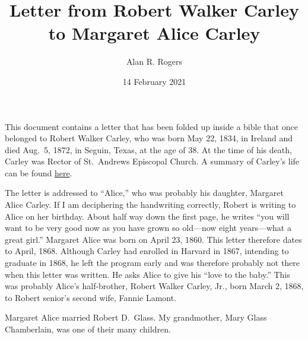 \documentclass[12pt]{article}
\begin{document}
\title{Letter from Robert Walker Carley to Margaret Alice Carley}
\author{Alan R. Rogers}
\date{14 February 2021}
\maketitle

This document contains a letter that has been folded up inside a bible
that once belonged to Robert Walker Carley, who was born May 22, 1834,
in Ireland and died Aug.\ 5, 1872, in Seguin, Texas, at the age of
38. At the time of his death, Carley was Rector of St.\ Andrews
Episcopal Church. A summary of Carley's life can be found
\href{https://www.newspapers.com/clip/21483199/robert-walker-carley-bio-from-seguin}{here}.

The letter is addressed to ``Alice,'' who was probably his daughter,
Margaret Alice Carley. If I am deciphering the handwriting correctly,
Robert is writing to Alice on her birthday. About half way down the
first page, he writes ``you will want to be very good now as you have
grown so old---now eight years---what a great girl.'' Margaret Alice
was born on April 23, 1860. This letter therefore dates to April,
1868. Although Carley had enrolled in Harvard in 1867, intending to
graduate in 1868, he left the program early and was therefore probably
not there when this letter was written. He asks Alice to give his
``love to the baby.'' This was probably Alice's half-brother, Robert
Walker Carley, Jr., born March 2, 1868, to Robert senior's second
wife, Fannie Lamont.

Margaret Alice married Robert D.\ Glass. My grandmother, Mary Glass
Chamberlain, was one of their many children.
\end{document}
